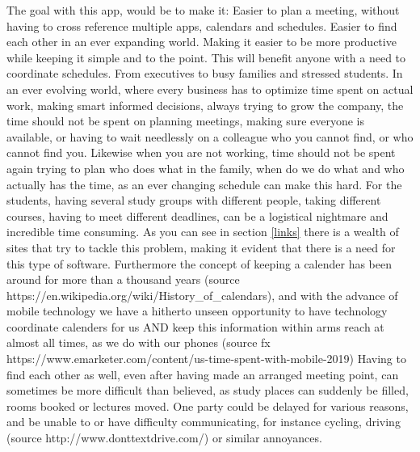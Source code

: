 \documentclass{article}
\begin{document}
The goal with this app, would be to make it: Easier to plan a meeting, without having to cross reference multiple apps, calendars and schedules. Easier to find each other in an ever expanding world. Making it easier to be more productive while keeping it simple and to the point. %
This will benefit anyone with a need to coordinate schedules. From executives to busy families and stressed students. In an ever evolving world, where every business has to optimize time spent on actual work, making smart informed decisions, always trying to grow the company, the time should not be spent on planning meetings, making sure everyone is available, or having to wait needlessly on a colleague who you cannot find, or who cannot find you. Likewise when you are not working, time should not be spent again trying to plan who does what in the family, when do we do what and who actually has the time, as an ever changing schedule can make this hard. For the students, having several study groups with different people, taking different courses, having to meet different deadlines, can be a logistical nightmare and incredible time consuming. As you can see in section \ref{links} there is a wealth of sites that try to tackle this problem, making it evident that there is a need for this type of software. Furthermore the concept of keeping a calender has been around for more than a thousand years (source https://en.wikipedia.org/wiki/History\_of\_calendars), and with the advance of mobile technology we have a hitherto unseen opportunity to have technology coordinate calenders for us AND keep this information within arms reach at almost all times, as we do with our phones (source fx https://www.emarketer.com/content/us-time-spent-with-mobile-2019)
Having to find each other as well, even after having made an arranged meeting point, can sometimes be more difficult than believed, as study places can suddenly be filled, rooms booked or lectures moved. One party could be delayed for various reasons, and be unable to or have difficulty communicating, for instance cycling, driving (source http://www.donttextdrive.com/) or similar annoyances. %
\end{document}
